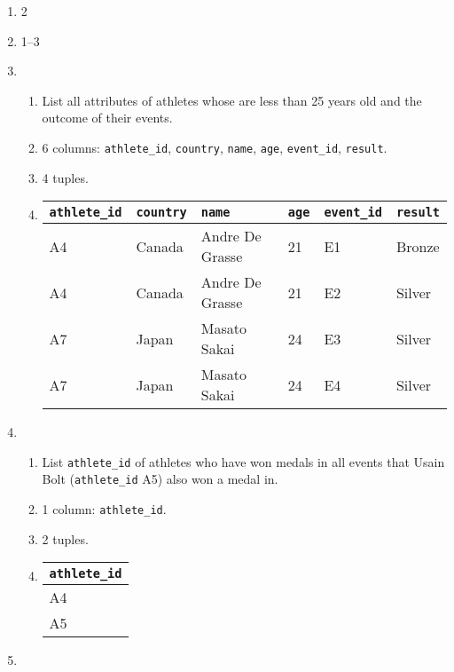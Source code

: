 \documentclass{article}
\begin{document}
\begin{enumerate}
    \item 2
    \item 1--3
    \item
    \begin{enumerate}
        \item List all attributes of athletes whose are less than 25 years old and the outcome of their events.
        \item 6 columns: \texttt{athlete\_id}, \texttt{country}, \texttt{name}, \texttt{age}, \texttt{event\_id}, \texttt{result}.
        \item 4 tuples.
        \item
        \begin{tabular}{@{}llllll@{}}
            \toprule
            \texttt{athlete\_id} & \texttt{country} & \texttt{name}            & \texttt{age} & \texttt{event\_id} & \texttt{result} \\ \midrule
            A4          & Canada  & Andre De Grasse & 21  & E1        & Bronze \\
            A4          & Canada  & Andre De Grasse & 21  & E2        & Silver \\
            A7          & Japan   & Masato Sakai    & 24  & E3        & Silver \\
            A7          & Japan   & Masato Sakai    & 24  & E4        & Silver \\ \bottomrule
        \end{tabular}
    \end{enumerate}
    \item
    \begin{enumerate}
        \item List \texttt{athlete\_id} of athletes who have won medals in all events that Usain Bolt (\texttt{athlete\_id} A5) also won a medal in.
        \item 1 column: \texttt{athlete\_id}.
        \item 2 tuples.
        \item 
        \begin{tabular}{@{}l@{}}
            \toprule
            \texttt{athlete\_id} \\ \midrule
            A4          \\
            A5          \\ \bottomrule
        \end{tabular}
    \end{enumerate}
    \item

\end{enumerate}
\end{document}

